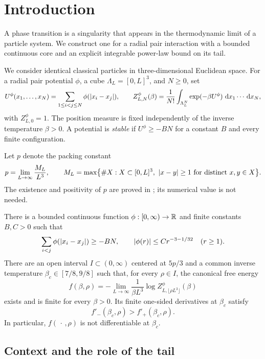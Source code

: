 \section{Introduction}\label{sec:introduction}

A phase transition is a singularity that appears in the thermodynamic
limit of a particle system.  We construct one for a radial pair
interaction with a bounded continuous core and an explicit integrable
power-law bound on its tail.

We consider identical classical particles in three-dimensional Euclidean space.
For a radial pair potential \(\phi\), a cube \(\Lambda_L=[0,L]^3\), and \(N\ge0\), set
\begin{equation}\label{eq:partition}
 U^\phi(x_1,\ldots,x_N)=\sum_{1\le i<j\le N}\phi(\left|x_i-x_j\right|),
 \qquad
 Z^\phi_{L,N}(\beta)=\frac1{N!}
  \int_{\Lambda_L^N}\exp(-\beta U^\phi)\,\,\mathrm d x_1\cdots\,\mathrm d x_N,
\end{equation}
with \(Z^\phi_{L,0}=1\).
The position measure is fixed independently of the inverse temperature
\(\beta>0\).
A potential is \emph{stable} if \(U^\phi\ge-BN\) for a constant \(B\)
and every finite configuration.

Let \(p\) denote the packing constant
\[
 p=\lim_{L\to\infty}\frac{M_L}{L^3},
 \qquad
 M_L=\max\bigl\{\#X:X\subset[0,L]^3,\
               \left|x-y\right|\ge1\ \text{for distinct }x,y\in X\bigr\}.
\]
The existence and positivity of \(p\) are proved in ;
its numerical value is not needed.

\begin{theorem}\label{thm:main}
There is a bounded continuous function
\(\phi:[0,\infty)\to\mathbb R\) and finite constants \(B,C>0\) such that
\[
 \sum_{i<j}\phi(\left|x_i-x_j\right|)\ge-BN,
 \qquad
 \left|\phi(r)\right|\le C r^{-3-1/32}\quad(r\ge1).
\]
There are an open interval \(I\subset(0,\infty)\) centered at \(5p/3\)
and a common inverse temperature \(\beta_c\in[7/8,9/8]\) such that,
for every \(\rho\in I\), the canonical free energy
\[
 f(\beta,\rho)=
 -\lim_{L\to\infty}\frac1{\beta L^3}
       \log Z^\phi_{L,\lfloor\rho L^3\rfloor}(\beta)
\]
exists and is finite for every \(\beta>0\).
Its finite one-sided derivatives at \(\beta_c\) satisfy
\[
 f'_-(\beta_c,\rho)>f'_+(\beta_c,\rho).
\]
In particular, \(f(\,\cdot\,,\rho)\) is not differentiable at \(\beta_c\).
\end{theorem}

\subsection{Context and the role of the tail}

